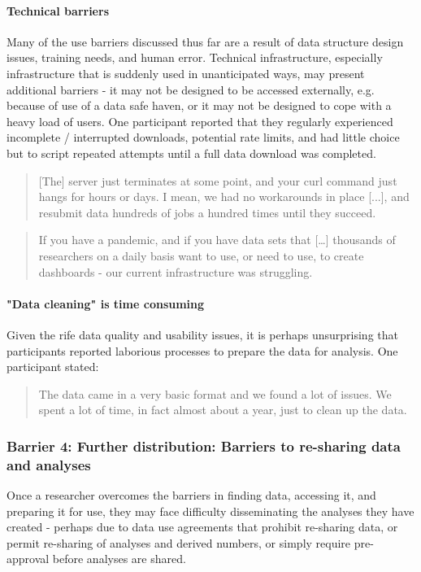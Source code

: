 \documentclass{CUP-JNL-DAP}%
\begin{document}
\paragraph{Technical barriers} 
Many of the use barriers discussed thus far are a result of data structure design issues, training needs, and human error. Technical infrastructure, especially infrastructure that is suddenly used in unanticipated ways, may present additional barriers - it may not be designed to be accessed externally, e.g. because of use of a data safe haven, or it may not be designed to cope with a heavy load of users. One participant reported that they regularly experienced incomplete / interrupted downloads, potential rate limits, and had little choice but to script repeated attempts until a full data download was completed. 

\blockquote{[The] server just terminates at some point, and your curl command just hangs for hours or days. I mean, we had no workarounds in place [...], and resubmit data hundreds of jobs a hundred times until they succeed.}

\blockquote{If you have a pandemic, and if you have data sets that […] thousands of researchers on a daily basis want to use, or need to use, to create dashboards - our current infrastructure was struggling.}

\paragraph{"Data cleaning" is time consuming} 

Given the rife data quality and usability issues, it is perhaps unsurprising that participants reported laborious processes to prepare the data for analysis. One participant stated: 

\blockquote{The data came in a very basic format and we found a lot of issues. We spent a lot of time, in fact almost about a year, just to clean up the data.}

\subsubsection{Barrier 4: Further distribution: Barriers to re-sharing data and analyses}

Once a researcher overcomes the barriers in finding data, accessing it, and preparing it for use, they may face difficulty disseminating the analyses they have created - perhaps due to data use agreements that prohibit re-sharing data, or permit re-sharing of analyses and derived numbers, or simply require pre-approval before analyses are shared. 
\end{document}
